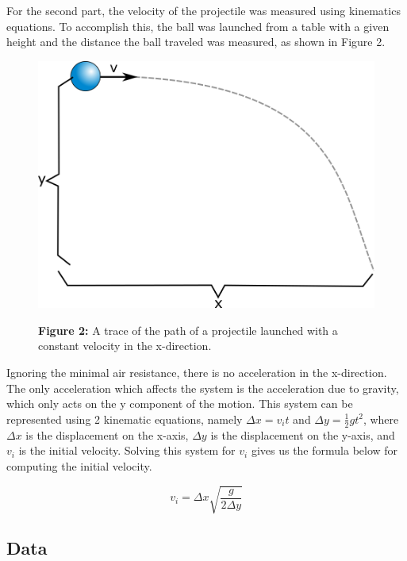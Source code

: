 \documentclass[11pt]{article}
\begin{document}
For the second part, the velocity of the projectile was measured using
kinematics equations. To accomplish this, the ball was launched from a
table with a given height and the distance the ball traveled was
measured, as shown in Figure 2. 
\begin{figure}
\begin{center}
\includegraphics[scale=0.4]{Part2Diagram.png}

\textbf{Figure 2:} A trace of the path of a projectile launched with a constant velocity in the x-direction.
\end{center}
\end{figure}
Ignoring the minimal air resistance, there is no acceleration in the x-direction. The only acceleration which
affects the system is the acceleration due to gravity, which only acts
on the y component of the motion. This system can be represented using 2
kinematic equations, namely \(\Delta x = v_i t\) and
\(\Delta y = \frac{1}{2}gt^2\), where \(\Delta x\) is the displacement
on the x-axis, \(\Delta y\) is the displacement on the y-axis, and
\(v_i\) is the initial velocity. Solving this system for \(v_i\) gives
us the formula below for computing the initial velocity.

\begin{equation}
v_i = \Delta x \sqrt{\frac {g}{2\Delta y}}
\end{equation}

\hypertarget{data}{%
\subsection*{\centering Data}\label{data}}
\end{document}
